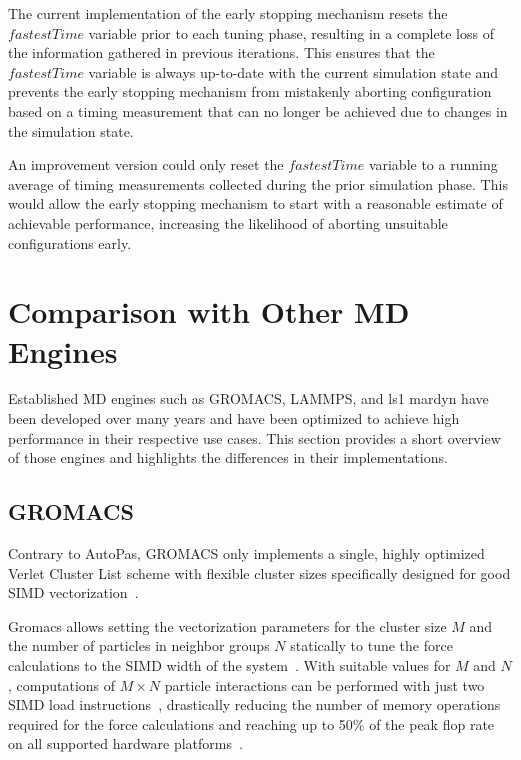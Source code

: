 \documentclass[conference]{IEEEtran}
\begin{document}
\begin{description}[leftmargin=1.2em, font=\itshape]
    \item[Limitations and Future Work:]
        The current implementation of the early stopping mechanism resets the $fastestTime$ variable prior to each tuning phase, resulting in a complete loss of the information gathered in previous iterations. This ensures that the $fastestTime$ variable is always up-to-date with the current simulation state and prevents the early stopping mechanism from mistakenly aborting configuration based on a timing measurement that can no longer be achieved due to changes in the simulation state.

        An improvement version could only reset the $fastestTime$ variable to a running average of timing measurements collected during the prior simulation phase. This would allow the early stopping mechanism to start with a reasonable estimate of achievable performance, increasing the likelihood of aborting unsuitable configurations early.

\end{description}

\section{Comparison with Other MD Engines}

Established MD engines such as GROMACS, LAMMPS, and ls1 mardyn have been developed over many years and have been optimized to achieve high performance in their respective use cases. This section provides a short overview of those engines and highlights the differences in their implementations.

\subsection{GROMACS}

Contrary to AutoPas, GROMACS only implements a single, highly optimized Verlet Cluster List scheme with flexible cluster sizes specifically designed for good SIMD vectorization~\cite{PALL20132641}.

Gromacs allows setting the vectorization parameters for the cluster size $M$ and the number of particles in neighbor groups $N$ statically to tune the force calculations to the SIMD width of the system~\cite{PALL20132641}. With suitable values for $M$ and $N$, computations of $M \times N$ particle interactions can be performed with just two SIMD load instructions~\cite{Solving_Software_Challenges_Exascale_2014}, drastically reducing the number of memory operations required for the force calculations and reaching up to 50\% of the peak flop rate on all supported hardware platforms~\cite{Solving_Software_Challenges_Exascale_2014}.
\end{document}
